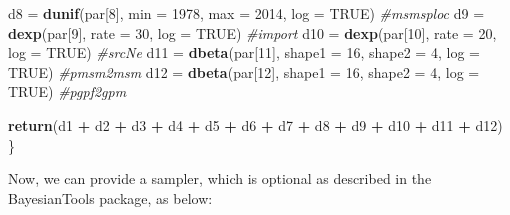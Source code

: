\documentclass[12pt,]{article}
\newenvironment{Shaded}{\begin{snugshade}}{\end{snugshade}}
\newcommand{\CommentTok}[1]{\textcolor[rgb]{0.56,0.35,0.01}{\textit{#1}}}
\newcommand{\DataTypeTok}[1]{\textcolor[rgb]{0.13,0.29,0.53}{#1}}
\newcommand{\DecValTok}[1]{\textcolor[rgb]{0.00,0.00,0.81}{#1}}
\newcommand{\KeywordTok}[1]{\textcolor[rgb]{0.13,0.29,0.53}{\textbf{#1}}}
\newcommand{\NormalTok}[1]{#1}
\newcommand{\OperatorTok}[1]{\textcolor[rgb]{0.81,0.36,0.00}{\textbf{#1}}}
\newcommand{\OtherTok}[1]{\textcolor[rgb]{0.56,0.35,0.01}{#1}}
\newcommand{\StringTok}[1]{\textcolor[rgb]{0.31,0.60,0.02}{#1}}
\begin{document}
\begin{Shaded}
\begin{Highlighting}[]
\NormalTok{  d8 =}\StringTok{ }\KeywordTok{dunif}\NormalTok{(par[}\DecValTok{8}\NormalTok{], }\DataTypeTok{min =} \DecValTok{1978}\NormalTok{, }\DataTypeTok{max =} \DecValTok{2014}\NormalTok{, }\DataTypeTok{log =} \OtherTok{TRUE}\NormalTok{) }\CommentTok{#msmsploc}
\NormalTok{  d9 =}\StringTok{ }\KeywordTok{dexp}\NormalTok{(par[}\DecValTok{9}\NormalTok{], }\DataTypeTok{rate =} \DecValTok{30}\NormalTok{, }\DataTypeTok{log =} \OtherTok{TRUE}\NormalTok{) }\CommentTok{#import}
\NormalTok{  d10 =}\StringTok{ }\KeywordTok{dexp}\NormalTok{(par[}\DecValTok{10}\NormalTok{], }\DataTypeTok{rate =} \DecValTok{20}\NormalTok{, }\DataTypeTok{log =} \OtherTok{TRUE}\NormalTok{) }\CommentTok{#srcNe}
\NormalTok{  d11 =}\StringTok{ }\KeywordTok{dbeta}\NormalTok{(par[}\DecValTok{11}\NormalTok{], }\DataTypeTok{shape1 =} \DecValTok{16}\NormalTok{, }\DataTypeTok{shape2 =} \DecValTok{4}\NormalTok{, }\DataTypeTok{log =} \OtherTok{TRUE}\NormalTok{) }\CommentTok{#pmsm2msm}
\NormalTok{  d12 =}\StringTok{ }\KeywordTok{dbeta}\NormalTok{(par[}\DecValTok{12}\NormalTok{], }\DataTypeTok{shape1 =} \DecValTok{16}\NormalTok{, }\DataTypeTok{shape2 =} \DecValTok{4}\NormalTok{, }\DataTypeTok{log =} \OtherTok{TRUE}\NormalTok{) }\CommentTok{#pgpf2gpm}

  \KeywordTok{return}\NormalTok{(d1 }\OperatorTok{+}\StringTok{ }\NormalTok{d2 }\OperatorTok{+}\StringTok{ }\NormalTok{d3 }\OperatorTok{+}\StringTok{ }\NormalTok{d4 }\OperatorTok{+}\StringTok{ }\NormalTok{d5 }\OperatorTok{+}\StringTok{ }\NormalTok{d6 }\OperatorTok{+}\StringTok{ }\NormalTok{d7 }\OperatorTok{+}\StringTok{ }\NormalTok{d8 }\OperatorTok{+}\StringTok{ }\NormalTok{d9 }\OperatorTok{+}\StringTok{ }\NormalTok{d10 }\OperatorTok{+}\StringTok{ }\NormalTok{d11 }\OperatorTok{+}\StringTok{ }\NormalTok{d12)}
\NormalTok{\}}
\end{Highlighting}
\end{Shaded}

Now, we can provide a sampler, which is optional as described in the
BayesianTools package, as below:
\end{document}
